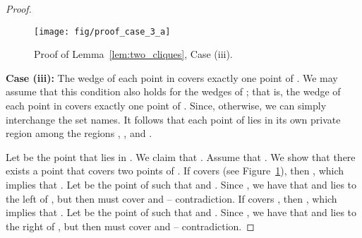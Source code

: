 \documentclass[11pt]{article}
\begin{document}
{\begin{proof}
\begin{figure}[htb]
 \centering 
    \texttt{[image: fig/proof\_case\_3\_a]}
 \label{fig:case3a}
 \caption{Proof of Lemma~\ref{lem:two_cliques}, Case (iii).}	\label{fig:case3}
\end{figure}

{\bf Case (iii):} The wedge of each point in  covers exactly one point of . We may assume that this condition also holds for the wedges of ; that is, the wedge of each point in  covers exactly one point of . Since, otherwise, we can simply interchange the set names. 
It follows that each point of  lies in its own private region among the regions , , and . 

Let  be the point that lies in . We claim that .
Assume that . We show that there exists a point  that covers two points of .
If  covers  (see Figure~\ref{fig:case3}), then , which implies that . Let  be the point of  such that  and . Since , we have that  and  lies to the left of , but then  must cover  and  -- contradiction.
If  covers , then , which implies that . Let  be the point of  such that  and . Since , we have that  and  lies to the right of , but then  must cover  and  -- contradiction.

\end{proof}
}
\end{document}
